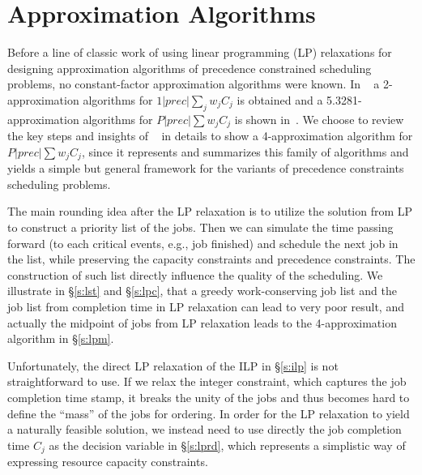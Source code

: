 \section{Approximation Algorithms} \label{s:lpr}

Before a line of classic work of using linear programming (LP) relaxations for designing approximation algorithms of precedence constrained scheduling problems, no constant-factor approximation algorithms were known. In ~\cite{schulz1996scheduling} a 2-approximation algorithms for $1|prec|\sum_j w_jC_j$ is obtained and a 5.3281-approximation algorithms for $P|prec|\sum w_jC_j$ is shown in~\cite{chakrabarti1996improved}. We choose to review the key steps and insights of ~\cite{queyranne2006approximation} in details to show a 4-approximation algorithm for $P|prec|\sum w_jC_j$, since it represents and summarizes this family of algorithms and yields a simple but general framework for the variants of precedence constraints scheduling problems.

The main rounding idea after the LP relaxation is to utilize the solution from LP to construct a priority list of the jobs. Then we can simulate  the time passing forward (to each critical events, e.g., job finished) and schedule the next job in the list, while preserving the capacity constraints and precedence constraints. The construction of such list directly influence the quality of the scheduling. We illustrate in \S\ref{s:lst} and \S\ref{s:lpc}, that a greedy work-conserving job list and the job list from completion time in LP relaxation can lead to very poor result, and actually the midpoint of jobs from LP relaxation leads to the 4-approximation algorithm in \S\ref{s:lpm}.

Unfortunately, the direct LP relaxation of the ILP in \S\ref{s:ilp} is not straightforward to use. If we relax the integer constraint, which captures the job completion time stamp, it breaks the unity of the jobs and thus becomes hard to define the ``mass'' of the jobs for ordering. In order for the LP relaxation to yield a naturally feasible solution, we instead need to use directly the job completion time $C_j$ as the decision variable in \S\ref{s:lprd}, which represents a simplistic way of expressing resource capacity constraints. 

